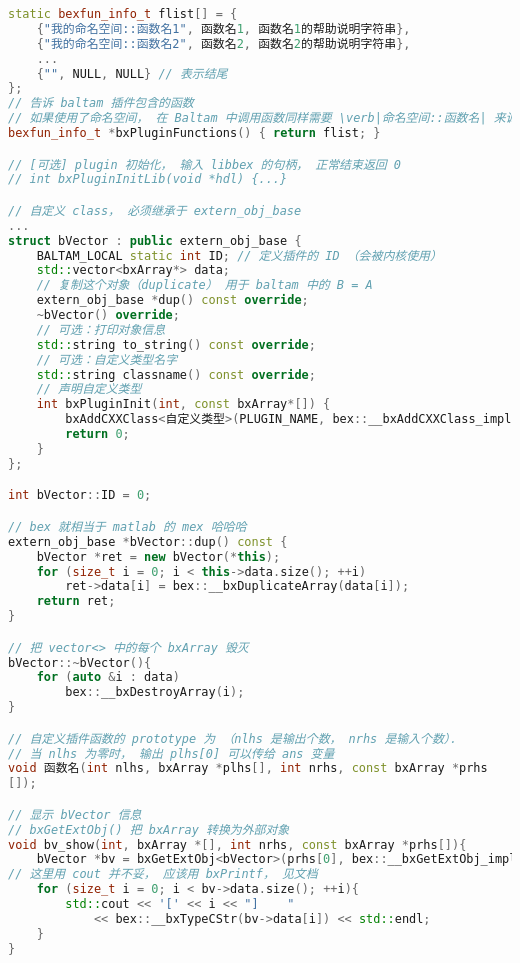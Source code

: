 \begin{lstlisting}[language=cpp,caption=vector 插件的 main.cpp]
static bexfun_info_t flist[] = {
    {"我的命名空间::函数名1", 函数名1, 函数名1的帮助说明字符串},
    {"我的命名空间::函数名2", 函数名2, 函数名2的帮助说明字符串},
    ...
    {"", NULL, NULL} // 表示结尾
};
// 告诉 baltam 插件包含的函数
// 如果使用了命名空间， 在 Baltam 中调用函数同样需要 \verb|命名空间::函数名| 来调用
bexfun_info_t *bxPluginFunctions() { return flist; }

// [可选] plugin 初始化， 输入 libbex 的句柄， 正常结束返回 0
// int bxPluginInitLib(void *hdl) {...}

// 自定义 class， 必须继承于 extern_obj_base
...
struct bVector : public extern_obj_base {
    BALTAM_LOCAL static int ID; // 定义插件的 ID （会被内核使用）
    std::vector<bxArray*> data;
    // 复制这个对象（duplicate） 用于 baltam 中的 B = A
    extern_obj_base *dup() const override;
    ~bVector() override;
    // 可选：打印对象信息
    std::string to_string() const override;
    // 可选：自定义类型名字
    std::string classname() const override;
    // 声明自定义类型
    int bxPluginInit(int, const bxArray*[]) {
        bxAddCXXClass<自定义类型>(PLUGIN_NAME, bex::__bxAddCXXClass_impl);
        return 0;
    }
};

int bVector::ID = 0;

// bex 就相当于 matlab 的 mex 哈哈哈
extern_obj_base *bVector::dup() const {
    bVector *ret = new bVector(*this);
    for (size_t i = 0; i < this->data.size(); ++i)
        ret->data[i] = bex::__bxDuplicateArray(data[i]);
    return ret;
}

// 把 vector<> 中的每个 bxArray 毁灭
bVector::~bVector(){
    for (auto &i : data)
        bex::__bxDestroyArray(i);
}

// 自定义插件函数的 prototype 为 （nlhs 是输出个数， nrhs 是输入个数）．
// 当 nlhs 为零时， 输出 plhs[0] 可以传给 ans 变量
void 函数名(int nlhs, bxArray *plhs[], int nrhs, const bxArray *prhs
[]);

// 显示 bVector 信息
// bxGetExtObj() 把 bxArray 转换为外部对象
void bv_show(int, bxArray *[], int nrhs, const bxArray *prhs[]){
    bVector *bv = bxGetExtObj<bVector>(prhs[0], bex::__bxGetExtObj_impl);
// 这里用 cout 并不妥， 应该用 bxPrintf， 见文档
    for (size_t i = 0; i < bv->data.size(); ++i){
        std::cout << '[' << i << "]    "
            << bex::__bxTypeCStr(bv->data[i]) << std::endl;
    }
}
\end{lstlisting}

